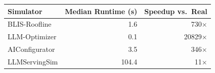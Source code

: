 \begin{tabular}{lrr}
\toprule
Simulator & Median Runtime (s) & Speedup vs.\ Real \\
\midrule
BLIS-Roofline & 1.6 & 730$\times$ \\
LLM-Optimizer & 0.1 & 20829$\times$ \\
AIConfigurator & 3.5 & 346$\times$ \\
LLMServingSim & 104.4 & 11$\times$ \\
\bottomrule
\end{tabular}